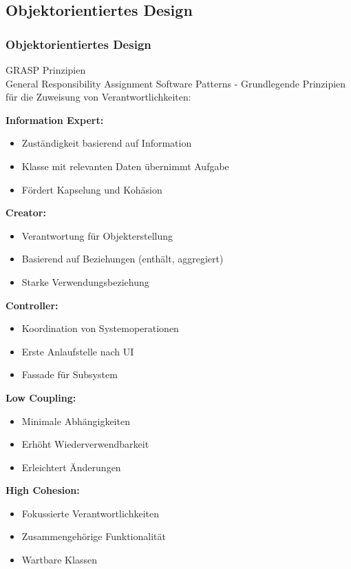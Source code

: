 \subsection{Objektorientiertes Design}


\subsubsection{Objektorientiertes Design}

\begin{concept}{GRASP Prinzipien}\\
General Responsibility Assignment Software Patterns - Grundlegende Prinzipien für die Zuweisung von Verantwortlichkeiten:

\textbf{Information Expert:}
\begin{itemize}
    \item Zuständigkeit basierend auf Information
    \item Klasse mit relevanten Daten übernimmt Aufgabe
    \item Fördert Kapselung und Kohäsion
\end{itemize}

\textbf{Creator:}
\begin{itemize}
    \item Verantwortung für Objekterstellung
    \item Basierend auf Beziehungen (enthält, aggregiert)
    \item Starke Verwendungsbeziehung
\end{itemize}

\textbf{Controller:}
\begin{itemize}
    \item Koordination von Systemoperationen
    \item Erste Anlaufstelle nach UI
    \item Fassade für Subsystem
\end{itemize}

\textbf{Low Coupling:}
\begin{itemize}
    \item Minimale Abhängigkeiten
    \item Erhöht Wiederverwendbarkeit
    \item Erleichtert Änderungen
\end{itemize}

\textbf{High Cohesion:}
\begin{itemize}
    \item Fokussierte Verantwortlichkeiten
    \item Zusammengehörige Funktionalität
    \item Wartbare Klassen
\end{itemize}
\end{concept}

